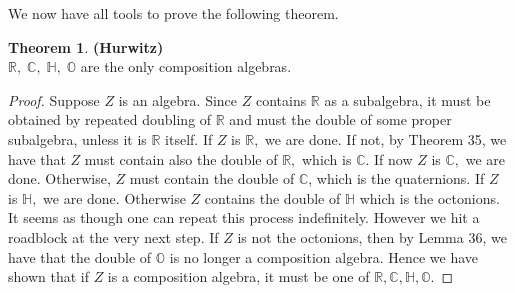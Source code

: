 \documentclass[11pt]{report}
\theoremstyle{plain}
\theoremstyle{definition}
\newtheorem{theorem}{Theorem}
\begin{document}
We now have all tools to prove the following theorem.
\begin{theorem}
	\textbf{(Hurwitz)}\\ $ \mathbb{R},\; \mathbb{C},\; \mathbb{H},\; \mathbb{O}  $ are the only composition algebras.
\end{theorem}
\begin{proof}
Suppose $ Z $ is an algebra. Since $ Z $ contains $ \mathbb{R} $ as a subalgebra, it must be obtained by repeated doubling of $ \mathbb{R} $ and must the double of some proper subalgebra, unless it is $ \mathbb{R} $ itself. If $ Z $ is $ \mathbb{R}, $ we are done. If not, by Theorem 35, we have that $ Z $ must contain also the double of $ \mathbb{R}, $ which is $ \mathbb{C} $. If now $Z $ is $ \mathbb{C},  $ we are done. Otherwise, $ Z $ must contain the double of $ \mathbb{C} $, which is the quaternions. If $ Z $ is $ \mathbb{H}, $ we are done. Otherwise $ Z$ contains the double of $ \mathbb{H} $ which is the octonions. It seems as though one can repeat this process indefinitely. However we hit a roadblock at the very next step. If $ Z $ is not the octonions, then by Lemma 36, we have that the double of $ \mathbb{O} $ is no longer a composition algebra. Hence we have shown that if $ Z $ is a composition algebra, it must be one of $ \mathbb{R}, \mathbb{C}, \mathbb{H}, \mathbb{O}. $
\end{proof}
\end{document}
